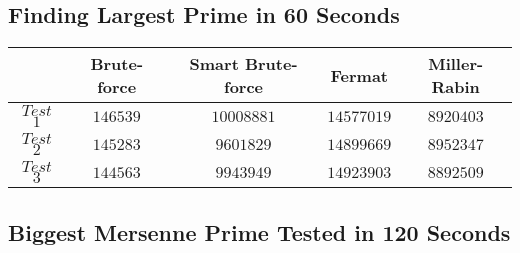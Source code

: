 \documentclass[main.tex]{subfiles}
\begin{document}
\subsection{Finding Largest Prime in 60 Seconds}
\label{test1}

\begin{table}[ht!]
  \begin{tabular}{||c | c c c c||}
    \hline
    & Brute-force & Smart Brute-force & Fermat & Miller-Rabin \\ [0.5ex] 
    \hline\hline
    $Test$ $1$ & $146539$ & $10008881$ & $14577019$ & $8920403$\\ 
    $Test$ $2$ & $145283$ & $9601829$ & $14899669$ & $8952347$\\ 
    $Test$ $3$ & $144563$ & $9943949$ & $14923903$ & $8892509$\\   [1ex] 
    \hline
  \end{tabular}
\end{table}

\subsection{Biggest Mersenne Prime Tested in 120 Seconds}
\label{test2}
\end{document}
